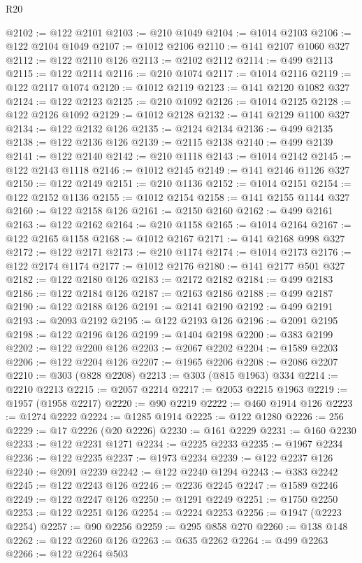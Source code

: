 \begin{lexlean}{R20}
\begin{coremodule}
@2102 := @122 @2101
@2103 := @210 @1049
@2104 := @1014 @2103
@2106 := @122 @2104 @1049
@2107 := @1012 @2106
@2110 := @141 @2107 @1060 @327
@2112 := @122 @2110 @126
@2113 := @2102 @2112
@2114 := @499 @2113
@2115 := @122 @2114
@2116 := @210 @1074
@2117 := @1014 @2116
@2119 := @122 @2117 @1074
@2120 := @1012 @2119
@2123 := @141 @2120 @1082 @327
@2124 := @122 @2123
@2125 := @210 @1092
@2126 := @1014 @2125
@2128 := @122 @2126 @1092
@2129 := @1012 @2128
@2132 := @141 @2129 @1100 @327
@2134 := @122 @2132 @126
@2135 := @2124 @2134
@2136 := @499 @2135
@2138 := @122 @2136 @126
@2139 := @2115 @2138
@2140 := @499 @2139
@2141 := @122 @2140
@2142 := @210 @1118
@2143 := @1014 @2142
@2145 := @122 @2143 @1118
@2146 := @1012 @2145
@2149 := @141 @2146 @1126 @327
@2150 := @122 @2149
@2151 := @210 @1136
@2152 := @1014 @2151
@2154 := @122 @2152 @1136
@2155 := @1012 @2154
@2158 := @141 @2155 @1144 @327
@2160 := @122 @2158 @126
@2161 := @2150 @2160
@2162 := @499 @2161
@2163 := @122 @2162
@2164 := @210 @1158
@2165 := @1014 @2164
@2167 := @122 @2165 @1158
@2168 := @1012 @2167
@2171 := @141 @2168 @998 @327
@2172 := @122 @2171
@2173 := @210 @1174
@2174 := @1014 @2173
@2176 := @122 @2174 @1174
@2177 := @1012 @2176
@2180 := @141 @2177 @501 @327
@2182 := @122 @2180 @126
@2183 := @2172 @2182
@2184 := @499 @2183
@2186 := @122 @2184 @126
@2187 := @2163 @2186
@2188 := @499 @2187
@2190 := @122 @2188 @126
@2191 := @2141 @2190
@2192 := @499 @2191
@2193 := @2093 @2192
@2195 := @122 @2193 @126
@2196 := @2091 @2195
@2198 := @122 @2196 @126
@2199 := @1404 @2198
@2200 := @383 @2199
@2202 := @122 @2200 @126
@2203 := @2067 @2202
@2204 := @1589 @2203
@2206 := @122 @2204 @126
@2207 := @1965 @2206
@2208 := @2086 @2207
@2210 := @303 (@828 @2208)
@2213 := @303 (@815 @1963) @334
@2214 := @2210 @2213
@2215 := @2057 @2214
@2217 := @2053 @2215 @1963
@2219 := @1957 (@1958 @2217)
@2220 := @90 @2219
@2222 := @460 @1914 @126
@2223 := @1274 @2222
@2224 := @1285 @1914
@2225 := @122 @1280
@2226 := 256
@2229 := @17 @2226 (@20 @2226)
@2230 := @161 @2229
@2231 := @160 @2230
@2233 := @122 @2231 @1271
@2234 := @2225 @2233
@2235 := @1967 @2234
@2236 := @122 @2235
@2237 := @1973 @2234
@2239 := @122 @2237 @126
@2240 := @2091 @2239
@2242 := @122 @2240 @1294
@2243 := @383 @2242
@2245 := @122 @2243 @126
@2246 := @2236 @2245
@2247 := @1589 @2246
@2249 := @122 @2247 @126
@2250 := @1291 @2249
@2251 := @1750 @2250
@2253 := @122 @2251 @126
@2254 := @2224 @2253
@2256 := @1947 (@2223 @2254)
@2257 := @90 @2256
@2259 := @295 @858 @270
@2260 := @138 @148
@2262 := @122 @2260 @126
@2263 := @635 @2262
@2264 := @499 @2263
@2266 := @122 @2264 @503

\end{coremodule}
\end{lexlean}
